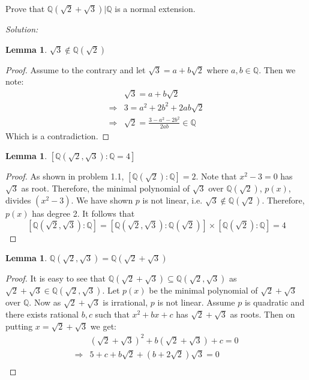 \documentclass[a4paper, 11pt]{article}
\newenvironment{solution}
    {\textit{Solution:}}
    {}
\newtheorem{lemma}[theorem]{Lemma}
\begin{document}
\begin{tcolorbox}[colback=c2,colframe=c1,title=Problem 2.3]
    Prove that $\mathbb Q(\sqrt 2+\sqrt{3})|\mathbb{Q}$ is a normal extension.
\end{tcolorbox}
\begin{solution}
    \begin{lemma}
        $\sqrt3\notin \mathbb Q(\sqrt{2})$
    \end{lemma}
    \begin{proof}
        Assume to the contrary and let $\sqrt 3=a+b\sqrt 2$ where $a,b\in\mathbb Q$. Then we note:
    \begin{align*}
        &\sqrt 3=a+b\sqrt 2\\
        \Rightarrow&3=a^2+2b^2+2ab\sqrt2\\
        \Rightarrow&\sqrt2=\frac{3-a^2-2b^2}{2ab}\in\mathbb{Q}
    \end{align*}
    Which is a contradiction.
    \end{proof}
    \begin{lemma}
        $[\mathbb Q(\sqrt 2,\sqrt{3}):\mathbb{Q}=4]$
    \end{lemma}
    \begin{proof}
        As shown in problem 1.1,  $[\mathbb Q(\sqrt 2):\mathbb Q]=2$. Note that $x^2-3=0$ has $\sqrt 3$ as root. Therefore, the minimal polynomial  of $\sqrt 3$ over $\mathbb Q(\sqrt 2)$, $p(x)$, divides $(x^2-3)$. We have shown $p$ is not linear, i.e. $\sqrt3\notin\mathbb Q(\sqrt2)$. Therefore, $p(x)$ has degree 2. It follows that
    $$[\mathbb Q(\sqrt 2,\sqrt3):\mathbb Q]=[\mathbb Q(\sqrt 2,\sqrt3):\mathbb Q(\sqrt 2)]\times [\mathbb Q(\sqrt 2):\mathbb Q]=4$$
    \end{proof}
    \begin{lemma}
        $\mathbb{Q}(\sqrt2,\sqrt3)=\mathbb{Q}(\sqrt 2+\sqrt 3)$
    \end{lemma}
    \begin{proof}
        It is easy to see that $\mathbb{Q}(\sqrt 2+\sqrt 3)\subseteq \mathbb{Q}(\sqrt2,\sqrt3)$ as $\sqrt2+\sqrt 3\in \mathbb{Q}(\sqrt2,\sqrt3)$. Let $p(x)$ be the minimal polynomial of $\sqrt2+\sqrt 3$ over $\mathbb Q$. Now as $\sqrt2+\sqrt 3$ is irrational, $p$ is not linear. Assume $p$ is quadratic and there exists rational $b,c$ such that $x^2+bx+c$ has $\sqrt2+\sqrt 3$ as roots. Then on putting $x=\sqrt2+\sqrt3$ we get:
        \begin{align*}
            &(\sqrt 2+\sqrt3)^2+b(\sqrt2+\sqrt3)+c=0\\
            \Rightarrow& 5+c+b\sqrt2+(b+2\sqrt2)\sqrt3=0\\

\end{align*}
\end{proof}
\end{solution}
\end{document}
